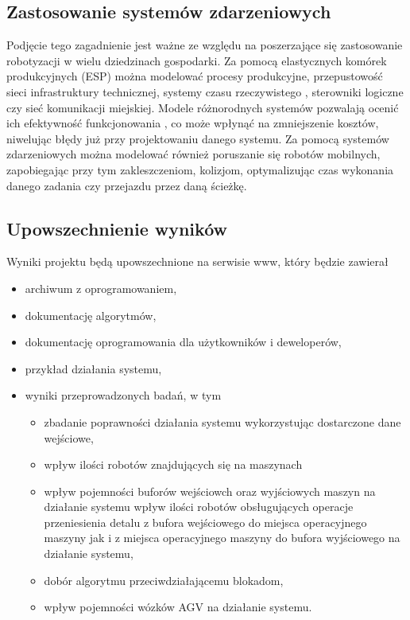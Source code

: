 \documentclass[10pt, a4paper]{article}
\begin{document}
\subsection{Zastosowanie systemów zdarzeniowych}
Podjęcie tego zagadnienie jest ważne ze względu na poszerzające się zastosowanie robotyzacji w wielu dziedzinach gospodarki. Za pomocą elastycznych komórek produkcyjnych (ESP) można modelować procesy produkcyjne, przepustowość sieci infrastruktury technicznej, systemy czasu rzeczywistego  \cite{scr} , sterowniki logiczne \cite{sl} czy sieć komunikacji miejskiej. Modele różnorodnych systemów pozwalają ocenić ich efektywność funkcjonowania \cite{mucha}, co może wpłynąć na zmniejszenie kosztów, niwelując błędy już przy projektowaniu danego systemu. Za pomocą systemów zdarzeniowych można modelować również poruszanie się robotów mobilnych, zapobiegając przy tym zakleszczeniom, kolizjom, optymalizując czas wykonania danego zadania czy przejazdu przez daną ścieżkę.

\subsection{Upowszechnienie wyników}

Wyniki projektu będą upowszechnione na serwisie www, który będzie zawierał
\begin{itemize}
\item archiwum z oprogramowaniem,
\item dokumentację algorytmów,
\item dokumentację oprogramowania dla użytkowników i deweloperów,
\item przykład działania systemu,
\item wyniki przeprowadzonych badań, w tym
\begin{itemize}
\item zbadanie poprawności działania systemu wykorzystując dostarczone dane wejściowe,
\item wpływ ilości robotów znajdujących się na maszynach
\item wpływ pojemności buforów wejściowch oraz wyjściowych maszyn na działanie systemu wpływ ilości robotów obsługujących operacje przeniesienia detalu z bufora wejściowego do miejsca operacyjnego maszyny jak i z miejsca operacyjnego maszyny do bufora wyjściowego na działanie systemu,
\item dobór algorytmu przeciwdziałającemu blokadom,
\item wpływ pojemności wózków AGV na działanie systemu.
\end{itemize}
\end{itemize}
\end{document}
